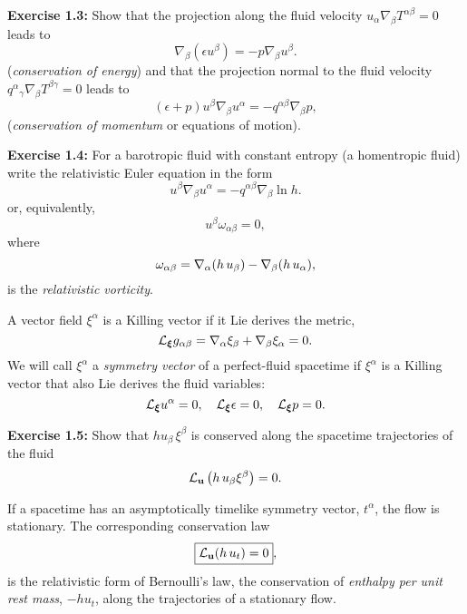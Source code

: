 \documentclass[12pt]{article}
\def\b{\beta}
\def\be{\begin{equation}}
\def\ee{\end{equation}}
\def\b{\beta}
\begin{document}
\vskip0.5cm

\textbf{Exercise 1.3:} Show that the projection along the fluid velocity  $ u_\alpha\nabla_\beta T^{\alpha\beta} = 0$
leads to 
\begin{equation}
\boxed {\nabla_\beta (\epsilon u^\beta ) = -p\nabla_\beta u^\beta}.
\label{econs}
\end{equation}
(\textit{conservation of energy}) and that the projection normal to the fluid velocity
$q^\alpha{}_\gamma \nabla_\beta T^{\beta\gamma} = 0$
 leads to 
\begin{equation}
\boxed{ (\epsilon +p)u^\beta\nabla_\beta u^\alpha
        = -q^{\alpha\beta}\nabla_\beta p},
\label{eq:euler}
\end{equation}
(\textit{conservation of momentum} or equations of motion).

\vskip0.5cm

\textbf{Exercise 1.4:} For a barotropic fluid with constant entropy (a homentropic fluid) write the relativistic Euler equation in the form 
\be
   u^\beta\nabla_\beta u^\alpha = -q^{\alpha\beta}\nabla_\beta\ln h.
\label{eq:euler1}\ee
or, equivalently,
\be
    u^\b \omega_{\alpha\beta} = 0,
\label{eq:euler1a}\ee
where\be
\omega_{\alpha\beta} = \nabla_\alpha ( h\,u_\beta )  -
  \nabla_\beta ( h\,u_\alpha ),    
\label{vorti}
\index{vorticity|textbf}\ee
is the {\it relativistic vorticity}. 


\vskip0.8cm



 A vector field $\xi^\alpha$ is a
Killing vector if it Lie derives the metric,
\be
{\cal L}_{\bm \xi}g_{\alpha\beta} = \nabla_\alpha\xi_\beta
+\nabla_\beta\xi_\alpha = 0.
\label{eq:killing}\index{Killing vector|textbf}\ee
We will call $\xi^\alpha$ a {\em
symmetry vector} of a perfect-fluid spacetime if $\xi^\alpha$ is a
Killing vector that also Lie derives the fluid variables:
\be
{\cal L}_{\bm \xi} u^\alpha = 0,\quad
{\cal L}_{\bm \xi} \epsilon =0,\quad {\cal L}_{\bm \xi} p = 0.
\label{Lie-xi}\ee

\vskip 0.5cm
\textbf{Exercise 1.5:} Show that $h u_\beta\, 
\xi^\beta$
is conserved along the spacetime trajectories of the fluid
\be {\cal L}_{\bf u} \left(h\,u_\beta \xi^\beta \right) = 0.
\label{killing}
\ee

\vskip0.8cm

 If a spacetime has an asymptotically timelike symmetry vector, $t^\alpha$, the flow is stationary.  The corresponding conservation law
\be
\boxed{{\cal L}_{\bf u} (h\, u_t)
 =
0},
\label{bernoulli}
\ee
{}
is the relativistic form of Bernoulli's law, the conservation of 
{\it enthalpy per unit rest mass}, $-hu_t$, along the trajectories of 
a stationary flow. 
\end{document}
